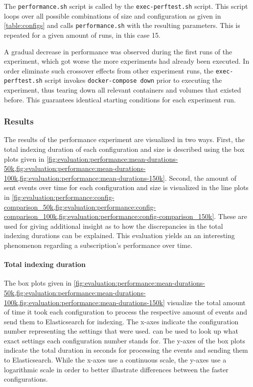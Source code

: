 The \texttt{performance.sh} script is called by the \texttt{exec-perftest.sh} script.
This script loops over all possible combinations of size and configuration as given in \cref{table:configs} and calls \texttt{performance.sh} with the resulting parameters.
This is repeated for a given amount of runs, in this case 15.

A gradual decrease in performance was observed during the first runs of the experiment, which got worse the more experiments had already been executed.
In order eliminate such crossover effects from other experiment runs, the \texttt{exec-perftest.sh} script invokes \texttt{docker-compose down} prior to executing the experiment, thus tearing down all relevant containers and volumes that existed before.
This guarantees identical starting conditions for each experiment run.

\subsubsection{Results}

The results of the performance experiment are visualized in two ways.
First, the total indexing duration of each configuration and size is described using the box plots given in \cref{fig:evaluation:performance:mean-durations-50k,fig:evaluation:performance:mean-durations-100k,fig:evaluation:performance:mean-durations-150k}.
Second, the amount of sent events over time for each configuration and size is visualized in the line plots in \cref{fig:evaluation:performance:config-comparison_50k,fig:evaluation:performance:config-comparison_100k,fig:evaluation:performance:config-comparison_150k}.
These are used for giving additional insight as to how the discrepancies in the total indexing durations can be explained.
This evaluation yields an an interesting phenomenon regarding a subscription's performance over time.

\paragraph{Total indexing duration}

The box plots given in \cref{fig:evaluation:performance:mean-durations-50k,fig:evaluation:performance:mean-durations-100k,fig:evaluation:performance:mean-durations-150k} visualize the total amount of time it took each configuration to process the respective amount of events and send them to Elasticsearch for indexing.
The x-axes indicate the configuration number representing the settings that were used.
 can be used to look up what exact settings each configuration number stands for.
The y-axes of the box plots indicate the total duration in seconds for processing the events and sending them to Elasticsearch.
While the x-axes use a continuous scale, the y-axes use a logarithmic scale in order to better illustrate differences between the faster configurations.

